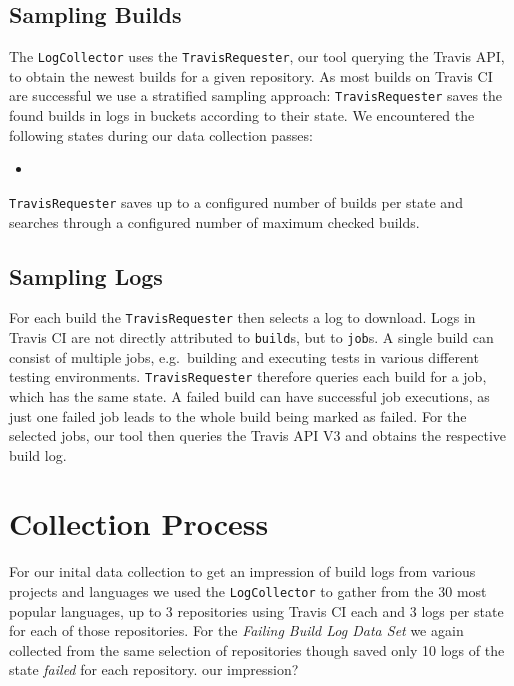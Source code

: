 \documentclass[\myrootdir/main.tex]{subfiles}
\begin{document}
\subsection{Sampling Builds}
The \texttt{LogCollector} uses the \texttt{TravisRequester}, our tool querying the Travis API, to obtain the newest builds for a given repository. As most builds on Travis CI are successful  we use a stratified sampling approach: \texttt{TravisRequester} saves the found builds in logs in buckets according to their state. We encountered the following states during our data collection passes:
\begin{itemize}
	\item {}
\end{itemize}
\texttt{TravisRequester} saves up to a configured number of builds per state and searches through a configured number of maximum checked builds.

\subsection{Sampling Logs}
For each build the \texttt{TravisRequester} then selects a log to download. Logs in Travis CI are not directly attributed to \texttt{build}s, but to \texttt{job}s.
A single build can consist of multiple jobs, e.g.\ building and executing tests in various different testing environments.
\texttt{TravisRequester} therefore queries each build for a job, which has the same state.
A failed build can have successful job executions, as just one failed job leads to the whole build being marked as failed.
For the selected jobs, our tool then queries the Travis API V3 and obtains the respective build log.


\section{Collection Process}
For our inital data collection to get an impression of build logs from various projects and languages we used the \texttt{LogCollector} to gather from the 30 most popular languages, up to 3 repositories using Travis CI each and 3 logs per state for each of those repositories.
For the \emph{Failing Build Log Data Set} we again collected from the same selection of repositories though saved only 10 logs of the state \emph{failed} for each repository.
our impression?
\end{document}
